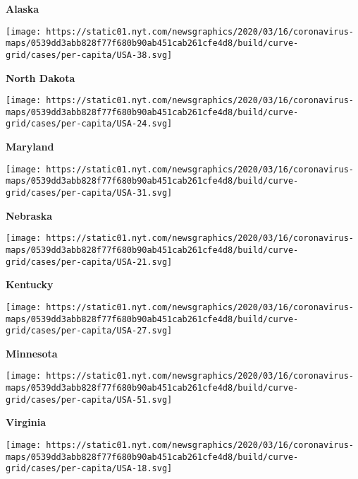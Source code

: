 \textbf{Alaska}

\href{https://www.nytimes.com/interactive/2020/us/north-dakota-coronavirus-cases.html}{}

\texttt{[image: https://static01.nyt.com/newsgraphics/2020/03/16/coronavirus-maps/0539dd3abb828f77f680b90ab451cab261cfe4d8/build/curve-grid/cases/per-capita/USA-38.svg]}

\textbf{North Dakota}

\href{https://www.nytimes.com/interactive/2020/us/maryland-coronavirus-cases.html}{}

\texttt{[image: https://static01.nyt.com/newsgraphics/2020/03/16/coronavirus-maps/0539dd3abb828f77f680b90ab451cab261cfe4d8/build/curve-grid/cases/per-capita/USA-24.svg]}

\textbf{Maryland}

\href{https://www.nytimes.com/interactive/2020/us/nebraska-coronavirus-cases.html}{}

\texttt{[image: https://static01.nyt.com/newsgraphics/2020/03/16/coronavirus-maps/0539dd3abb828f77f680b90ab451cab261cfe4d8/build/curve-grid/cases/per-capita/USA-31.svg]}

\textbf{Nebraska}

\href{https://www.nytimes.com/interactive/2020/us/kentucky-coronavirus-cases.html}{}

\texttt{[image: https://static01.nyt.com/newsgraphics/2020/03/16/coronavirus-maps/0539dd3abb828f77f680b90ab451cab261cfe4d8/build/curve-grid/cases/per-capita/USA-21.svg]}

\textbf{Kentucky}

\href{https://www.nytimes.com/interactive/2020/us/minnesota-coronavirus-cases.html}{}

\texttt{[image: https://static01.nyt.com/newsgraphics/2020/03/16/coronavirus-maps/0539dd3abb828f77f680b90ab451cab261cfe4d8/build/curve-grid/cases/per-capita/USA-27.svg]}

\textbf{Minnesota}

\href{https://www.nytimes.com/interactive/2020/us/virginia-coronavirus-cases.html}{}

\texttt{[image: https://static01.nyt.com/newsgraphics/2020/03/16/coronavirus-maps/0539dd3abb828f77f680b90ab451cab261cfe4d8/build/curve-grid/cases/per-capita/USA-51.svg]}

\textbf{Virginia}

\href{https://www.nytimes.com/interactive/2020/us/indiana-coronavirus-cases.html}{}

\texttt{[image: https://static01.nyt.com/newsgraphics/2020/03/16/coronavirus-maps/0539dd3abb828f77f680b90ab451cab261cfe4d8/build/curve-grid/cases/per-capita/USA-18.svg]}

